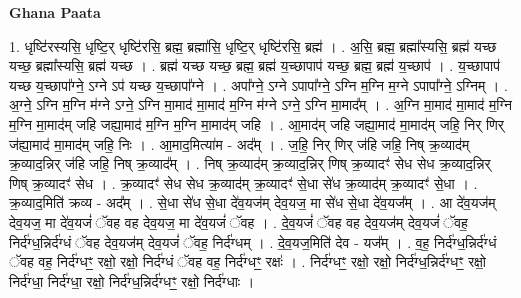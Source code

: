 \documentclass[17pt]{extarticle}
\begin{document}
\textbf{Ghana Paata } \newline

1. धृष्टि॑रस्यसि॒ धृष्टि॒र् धृष्टि॑रसि॒ ब्रह्म॒ ब्रह्मा॑सि॒ धृष्टि॒र् धृष्टि॑रसि॒ ब्रह्म॑ । . अ॒सि॒ ब्रह्म॒ ब्रह्मा᳚स्यसि॒ ब्रह्म॑ यच्छ यच्छ॒ ब्रह्मा᳚स्यसि॒ ब्रह्म॑ यच्छ । . ब्रह्म॑ यच्छ यच्छ॒ ब्रह्म॒ ब्रह्म॑ य॒च्छापाप॑ यच्छ॒ ब्रह्म॒ ब्रह्म॑ य॒च्छाप॑ । . य॒च्छापाप॑ यच्छ य॒च्छापा᳚ग्ने॒ ऽग्ने ऽप॑ यच्छ य॒च्छापा᳚ग्ने । . अपा᳚ग्ने॒ ऽग्ने ऽपापा᳚ग्ने॒ ऽग्नि म॒ग्नि म॒ग्ने ऽपापा᳚ग्ने॒ ऽग्निम् । . अ॒ग्ने॒ ऽग्नि म॒ग्नि म॑ग्ने ऽग्ने॒ ऽग्नि मा॒माद॑ मा॒माद॑ म॒ग्नि म॑ग्ने ऽग्ने॒ ऽग्नि मा॒माद᳚म् । . अ॒ग्नि मा॒माद॑ मा॒माद॑ म॒ग्नि म॒ग्नि मा॒माद॑म् जहि जह्या॒माद॑ म॒ग्नि म॒ग्नि मा॒माद॑म् जहि । . आ॒माद॑म् जहि जह्या॒माद॑ मा॒माद॑म् जहि॒ निर् णिर् ज॑ह्या॒माद॑ मा॒माद॑म् जहि॒ निः । . आ॒माद॒मित्या॑म - अद᳚म् । . ज॒हि॒ निर् णिर् ज॑हि जहि॒ निष् क्र॒व्याद॑म् क्र॒व्याद॒न्निर् ज॑हि जहि॒ निष् क्र॒व्याद᳚म् । . निष् क्र॒व्याद॑म् क्र॒व्याद॒न्निर् णिष् क्र॒व्यादꣳ॑ सेध सेध क्र॒व्याद॒न्निर् णिष् क्र॒व्यादꣳ॑ सेध । . क्र॒व्यादꣳ॑ सेध सेध क्र॒व्याद॑म् क्र॒व्यादꣳ॑ से॒धा से॑ध क्र॒व्याद॑म् क्र॒व्यादꣳ॑ से॒धा । . क्र॒व्याद॒मिति॑ क्रव्य - अद᳚म् । . से॒धा से॑ध से॒धा दे॑व॒यज॑म् देव॒यज॒ मा से॑ध से॒धा दे॑व॒यज᳚म् । . आ दे॑व॒यज॑म् देव॒यज॒ मा दे॑व॒यजं॑ ॅवह वह देव॒यज॒ मा दे॑व॒यजं॑ ॅवह । . दे॒व॒यजं॑ ॅवह वह देव॒यज॑म् देव॒यजं॑ ॅवह॒ निर्द॑ग्ध॒न्निर्द॑ग्धं ॅवह देव॒यज॑म् देव॒यजं॑ ॅवह॒ निर्द॑ग्धम् । . दे॒व॒यज॒मिति॑ देव - यज᳚म् । . व॒ह॒ निर्द॑ग्ध॒न्निर्द॑ग्धं ॅवह वह॒ निर्द॑ग्धꣳ॒॒ रक्षो॒ रक्षो॒ निर्द॑ग्धं ॅवह वह॒ निर्द॑ग्धꣳ॒॒ रक्षः॑ । . निर्द॑ग्धꣳ॒॒ रक्षो॒ रक्षो॒ निर्द॑ग्ध॒न्निर्द॑ग्धꣳ॒॒ रक्षो॒ निर्द॑ग्धा॒ निर्द॑ग्धा॒ रक्षो॒ निर्द॑ग्ध॒न्निर्द॑ग्धꣳ॒॒ रक्षो॒ निर्द॑ग्धाः । \newline
\end{document}
